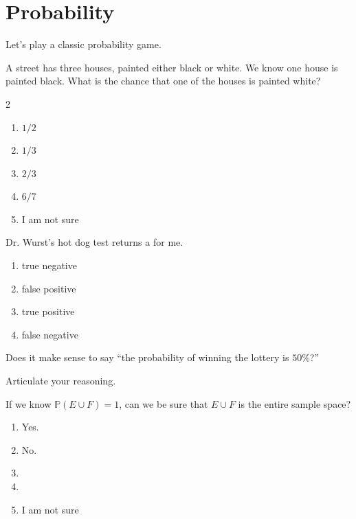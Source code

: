 \documentclass[aspectratio=169, t, 14pt]{beamer}
\begin{document}
\section{Probability}

\begin{frame}[c]
  Let's play a classic probability game.

  A street has three houses, painted either black or white. We know one house is painted black. What is the chance that one of the houses is painted white?

  \begin{multicols}{2}
    \begin{enumerate}
      \item \(1/2\)
      \item \(1/3\)
      \item \(2/3\)
      \item \(6/7\)
      \item I am not sure
    \end{enumerate}
  \end{multicols}
  
\end{frame}

\begin{frame}[t]
  Dr. Wurst's hot dog test returns a \underline{\hspace{2cm}} for me.

  \begin{enumerate}
    \item true negative
    \item false positive
    \item true positive
    \item false negative
  \end{enumerate}

\end{frame}

\begin{frame}[c]
  Does it make sense to say ``the probability of winning the lottery is \(50\%\)?''

  Articulate your reasoning. 
\end{frame}

\begin{frame}
  If we know \(\mathbb{P}(E \cup F) = 1\), can we be sure that \(E \cup F\) is the entire sample space?

 \begin{enumerate}
    \item Yes.
    \item No.
    \item 
    \item 
    \item I am not sure
  \end{enumerate} 
\end{frame}
\end{document}
